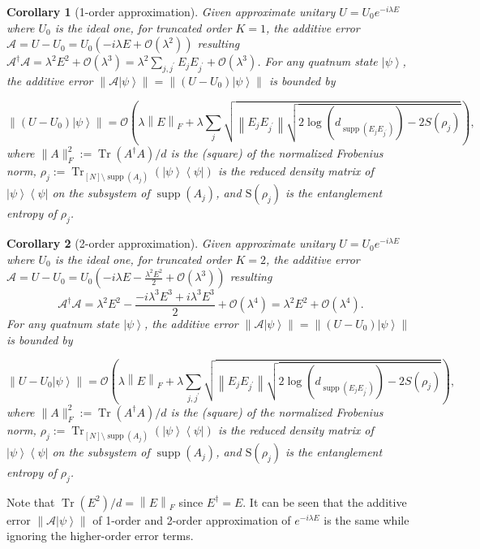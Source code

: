 \documentclass[12pt]{article}
\newtheorem{corollary}{Corollary}
\newcommand{\ket}[1]{\left|#1\right\rangle}
\newcommand{\bra}[1]{\left\langle #1\right|}
\newcommand{\norm}[1]{\left\lVert #1\right\rVert}
\newcommand{\mc}{\mathcal}
\newcommand{\Tr}{\operatorname{Tr}}
\DeclareMathOperator{\support}{supp}
\begin{document}
\begin{corollary}[1-order approximation]
Given approximate unitary $U=U_0 e^{-i\lambda E}$ where $U_0$ is the ideal one, for truncated order $K=1$, the additive error $\mathscr{A}=U-U_0=U_0(-i\lambda E+\mc{O} (\lambda^2))$ resulting $\mathscr{A}^\dagger \mathscr{A}=\lambda^2E^2+\mc{O}(\lambda^3)=\lambda^2 \sum_{j,j^\prime} E_jE_{j^\prime}+\mc{O}(\lambda^3)$. For any quatnum state $\ket{\psi}$, the additive error $\norm{\mathscr{A}\ket{\psi}}=\norm{(U-U_0)\ket{\psi}}$ is bounded by 

\begin{equation}
    \norm{(U-U_0)\ket{\psi}}= \mc{O}( \lambda \norm{E}_F+ \lambda\sum_j \sqrt{\norm{E_jE_{j^\prime}} \sqrt{2\log(d_{\support(E_{j}E_{j^\prime})})-2S(\rho_{j})}}),
\end{equation}
where  $\|A\|^2_F:= \Tr(A^{\dagger}A) /d$ is the (square) of the normalized Frobenius norm, $\rho_{j}:=\Tr_{[N]\setminus \support(A_j)}(\ket{\psi}\bra{\psi})$ is the reduced density matrix of $\ket{\psi}\bra{\psi}$ on the subsystem of $\support(A_j)$, and $\text{S}(\rho_{j})$ is the entanglement entropy of $\rho_{j}$.
\end{corollary}


\begin{corollary}[2-order approximation]
Given approximate unitary $U=U_0 e^{-i\lambda E}$ where $U_0$ is the ideal one, for truncated order $K=2$, the additive error $\mathscr{A}=U-U_0=U_0(-i\lambda E-\frac{\lambda^2E^2}{2}+\mc{O} (\lambda^3))$ resulting $$\mathscr{A}^\dagger \mathscr{A}=\lambda^2E^2-\frac{-i\lambda^3E^3+i\lambda^3E^3}{2}+\mc{O}(\lambda^4)=\lambda^2E^2+\mc{O}(\lambda^4).$$ For any quatnum state $\ket{\psi}$, the additive error $\norm{\mathscr{A}\ket{\psi}}=\norm{(U-U_0)\ket{\psi}}$ is bounded by 

\begin{equation}
    \norm{U-U_0\ket{\psi}}= \mc{O}( \lambda \norm{E}_F+\lambda\sum_{j,j^\prime} \sqrt{\norm{E_jE_{j^\prime}} \sqrt{2\log(d_{\support(E_{j}E_{j^\prime})})-2S(\rho_{j})}}),
\end{equation}
where  $\|A\|^2_F:= \Tr(A^{\dagger}A) /d$ is the (square) of the normalized Frobenius norm, $\rho_{j}:=\Tr_{[N]\setminus \support(A_j)}(\ket{\psi}\bra{\psi})$ is the reduced density matrix of $\ket{\psi}\bra{\psi}$ on the subsystem of $\support(A_j)$, and $\text{S}(\rho_{j})$ is the entanglement entropy of $\rho_{j}$.
\end{corollary}
 Note that $\Tr(E^2)/d=\norm{E}_F$ since $E^\dag=E$.
It can be seen that the additive error $\norm{\mathscr{A} \ket{\psi}}$ of 1-order and 2-order approximation of $e^{-i\lambda E}$ is the same while ignoring the
higher-order error terms. \\
\end{document}
